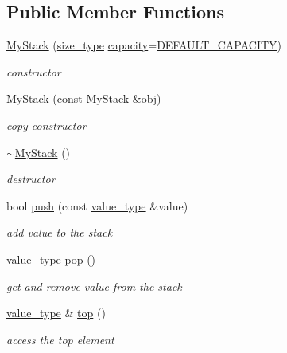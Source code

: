 \subsection*{Public Member Functions}
\begin{DoxyCompactItemize}
\item 
\hyperlink{class_my_stack_aacc8c6eb2c3ae83c01f14a5f58477254}{My\+Stack} (\hyperlink{class_my_stack_a6e8ab1801eb1cf3b66928e0c0f2fe0fe}{size\+\_\+type} \hyperlink{class_my_stack_a3248e4407d1f6ba16402707ff9462966}{capacity}=\hyperlink{class_my_stack_a196ecbddd3e12d87fd29c8d61d04ba5b}{D\+E\+F\+A\+U\+L\+T\+\_\+\+C\+A\+P\+A\+C\+I\+TY})
\begin{DoxyCompactList}\small\item\em constructor \end{DoxyCompactList}\item 
\hyperlink{class_my_stack_ac8e6964620eadb0c92965e111fb0e07f}{My\+Stack} (const \hyperlink{class_my_stack}{My\+Stack} \&obj)
\begin{DoxyCompactList}\small\item\em copy constructor \end{DoxyCompactList}\item 
\hyperlink{class_my_stack_aef06833eaa332c29f0e24e6816e2715f}{$\sim$\+My\+Stack} ()
\begin{DoxyCompactList}\small\item\em destructor \end{DoxyCompactList}\item 
bool \hyperlink{class_my_stack_ad2908ca3de1e2496ddf3c38b39e44ba5}{push} (const \hyperlink{class_my_stack_aef491ce2544b335e96d24a39ad23bc7c}{value\+\_\+type} \&value)
\begin{DoxyCompactList}\small\item\em add value to the stack \end{DoxyCompactList}\item 
\hyperlink{class_my_stack_aef491ce2544b335e96d24a39ad23bc7c}{value\+\_\+type} \hyperlink{class_my_stack_a9f919749f79ab445c6437cac3830e7bb}{pop} ()
\begin{DoxyCompactList}\small\item\em get and remove value from the stack \end{DoxyCompactList}\item 
\hyperlink{class_my_stack_aef491ce2544b335e96d24a39ad23bc7c}{value\+\_\+type} \& \hyperlink{class_my_stack_a18fae44197902a8f44f01cc394d15ccd}{top} ()
\begin{DoxyCompactList}\small\item\em access the top element \end{DoxyCompactList}\item 

\end{DoxyCompactItemize}
